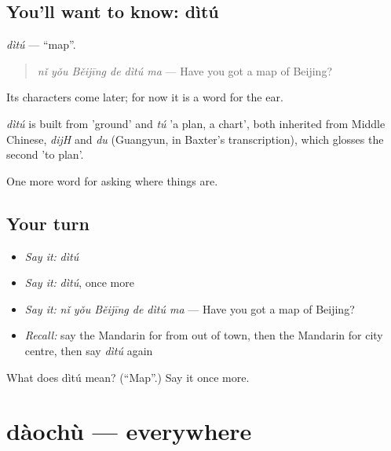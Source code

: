 \subsection*{You'll want to know: dìtú}
\emph{dìtú} — \textquotedblleft{}map\textquotedblright{}.

\begin{quote}
\emph{nǐ yǒu Běijīng de dìtú ma} — Have you got a map of Beijing?
\end{quote}

Its characters come later; for now it is a word for the ear.

\begin{cousinweb}
\emph{dìtú} is built from  'ground' and \emph{tú} 'a plan, a chart', both inherited from Middle Chinese, \emph{dijH} and \emph{du} (Guangyun, in Baxter's transcription), which glosses the second 'to plan'.
\end{cousinweb}

\begin{grammarlens}[title={What you've built}]
One more word for asking where things are.
\end{grammarlens}

\subsection*{Your turn}
\begin{itemize}
\raggedright
  \item \emph{Say it:} \emph{dìtú}
  \item \emph{Say it:} \emph{dìtú}, once more
  \item \emph{Say it:} \emph{nǐ yǒu Běijīng de dìtú ma} — Have you got a map of Beijing?
  \item \emph{Recall:} say the Mandarin for from out of town, then the Mandarin for city centre, then say \emph{dìtú} again
\end{itemize}

\begin{tcolorbox}[breakable,colback=teal!4,colframe=teal!35!black,title={Before you move on}]
What does dìtú mean? (\textquotedblleft{}Map\textquotedblright{}.) Say it once more.
\end{tcolorbox}
\section[dàochù]{dàochù — everywhere}

\label{lesson:ZH-C211-daochu}



